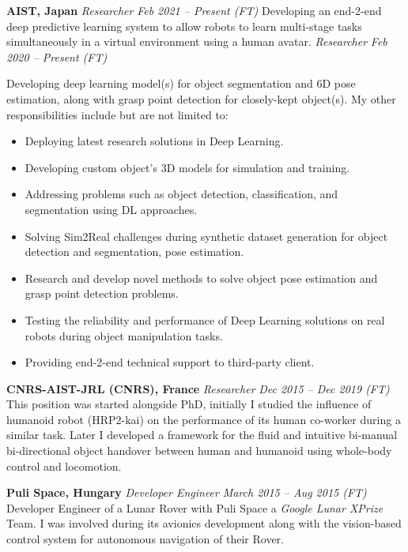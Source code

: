 \documentclass[10pt, oneside]{article} %
\begin{document}
\begin{paracol}{2}
\workpositionmulti
{\textbf{AIST, Japan}}
{\textit{Researcher} \hfill \footnotesize{\textit{Feb 2021 -- Present \hspace{10pt}(FT)}}}
{Developing an end-2-end deep predictive learning system to allow robots to learn multi-stage tasks simultaneously in a virtual environment using a human avatar.}
{\textit{Researcher} \hfill \footnotesize{\textit{Feb 2020 -- Present \hspace{10pt}(FT)}}}
{Developing deep learning model(s) for object segmentation and 6D pose estimation, along with grasp point detection for closely-kept object(s). My other responsibilities include but are not limited to:
\begin{itemize}[leftmargin=*, noitemsep, topsep=0pt]
    \item Deploying latest research solutions in Deep Learning.
    \item Developing custom object's 3D models for simulation and training.
    \item Addressing problems such as object detection, classification, and segmentation using DL approaches.
    \item Solving Sim2Real challenges during synthetic dataset generation for object detection and segmentation, pose estimation.
    \item Research and develop novel methods to solve object pose estimation and grasp point detection problems.
    \item Testing the reliability and performance of Deep Learning solutions on real robots during object manipulation tasks.
    \item Providing end-2-end technical support to third-party client.
    \newline
\end{itemize}
}



\workposition
{\textbf{CNRS-AIST-JRL (CNRS), France}}
{\textit{Researcher} \hfill \footnotesize{\textit{Dec 2015 -- Dec 2019 \hspace{10pt}(FT)}}}
{This position was started alongside PhD, initially I studied the influence of humanoid robot (HRP2-kai) on the performance of its human co-worker during a similar task. Later I developed a framework for the fluid and intuitive bi-manual bi-directional object handover between human and humanoid using whole-body control and locomotion.}

\workposition
{\textbf{Puli Space, Hungary}}
{\textit{Developer Engineer} \hfill \footnotesize{\textit{March 2015 -- Aug 2015 \hspace{10pt}(FT)}}}
{Developer Engineer of a Lunar Rover with Puli Space a \textit{Google Lunar XPrize} Team. I was involved during its avionics development along with the vision-based control system for autonomous navigation of their Rover.}


\end{paracol}
\end{document}
